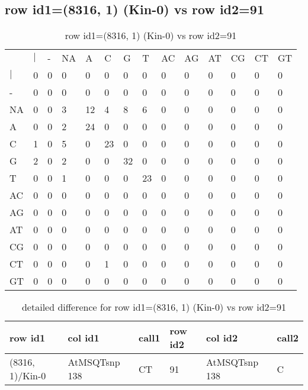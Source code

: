 \subsection{row id1=(8316, 1) (Kin-0) vs row id2=91}
\begin{center}
\begin{longtable}{|l|l|l|l|l|l|l|l|l|l|l|l|l|l|}
\caption{row id1=(8316, 1) (Kin-0) vs row id2=91} \label{table_dm504}\\
\hline
\\
\hline
&$|$&-&NA&A&C&G&T&AC&AG&AT&CG&CT&GT\\
$|$&0&0&0&0&0&0&0&0&0&0&0&0&0\\
-&0&0&0&0&0&0&0&0&0&0&0&0&0\\
NA&0&0&3&12&4&8&6&0&0&0&0&0&0\\
A&0&0&2&24&0&0&0&0&0&0&0&0&0\\
C&1&0&5&0&23&0&0&0&0&0&0&0&0\\
G&2&0&2&0&0&32&0&0&0&0&0&0&0\\
T&0&0&1&0&0&0&23&0&0&0&0&0&0\\
AC&0&0&0&0&0&0&0&0&0&0&0&0&0\\
AG&0&0&0&0&0&0&0&0&0&0&0&0&0\\
AT&0&0&0&0&0&0&0&0&0&0&0&0&0\\
CG&0&0&0&0&0&0&0&0&0&0&0&0&0\\
CT&0&0&0&0&1&0&0&0&0&0&0&0&0\\
GT&0&0&0&0&0&0&0&0&0&0&0&0&0\\
\hline
\end{longtable}
\end{center}

\begin{center}
\begin{longtable}{|l|l|l|l|l|l|}
\caption{detailed difference for row id1=(8316, 1) (Kin-0) vs row id2=91} \label{table_dm505}\\
\hline
row id1&col id1&call1&row id2&col id2&call2\\
\hline
(8316, 1)/Kin-0&AtMSQTsnp 138&CT&91&AtMSQTsnp 138&C\\
\hline
\end{longtable}
\end{center}

